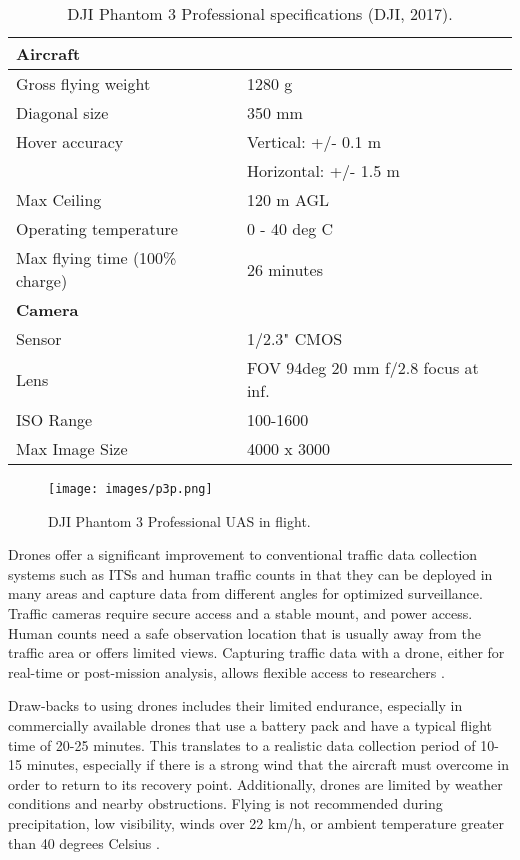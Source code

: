 \begin{table}[H]
\centering
\caption[DJI Phantom 3 Professional specifications]{DJI Phantom 3 Professional specifications (DJI, 2017).}
\label{tb:p3p-specs}
\begin{tabular}{@{}ll@{}}
\hline
\textbf{Aircraft} &  \\ \hline
Gross flying weight & 1280 g \\
Diagonal size & 350 mm \\
Hover accuracy & Vertical: +/- 0.1 m \\
 & Horizontal: +/- 1.5 m \\
Max Ceiling & 120 m AGL \\
Operating temperature & 0 - 40 deg C \\
Max flying time (100\% charge) & 26 minutes \\ \hline
\textbf{Camera} &  \\ \hline
Sensor & 1/2.3" CMOS \\
Lens & FOV 94deg 20 mm f/2.8 focus at inf. \\
ISO Range & 100-1600 \\
Max Image Size & 4000 x 3000 \\ \hline
\end{tabular}
\end{table}

%
\begin{figure}[H]
\centering
\texttt{[image: images/p3p.png]}  %
\caption{DJI Phantom 3 Professional UAS in flight.}
\label{fig:p3p}
\end{figure}
%
Drones offer a significant improvement to conventional traffic data collection systems such as ITSs and human traffic counts in that they can be deployed in many areas and capture data from different angles for optimized surveillance. Traffic cameras require secure access and a stable mount, and power access. Human counts need a safe observation location that is usually away from the traffic area or offers limited views. Capturing traffic data with a drone, either for real-time or post-mission analysis, allows flexible access to researchers \citep{Westoby2012}. 

Draw-backs to using drones includes their limited endurance, especially in commercially available drones that use a battery pack and have a typical flight time of 20-25 minutes. This translates to a realistic data collection period of 10-15 minutes, especially if there is a strong wind that the aircraft must overcome in order to return to its recovery point. Additionally, drones are limited by weather conditions and nearby obstructions. Flying is not recommended during precipitation, low visibility, winds over 22 km/h, or ambient temperature greater than 40 degrees Celsius \citep{DJI2017}.

